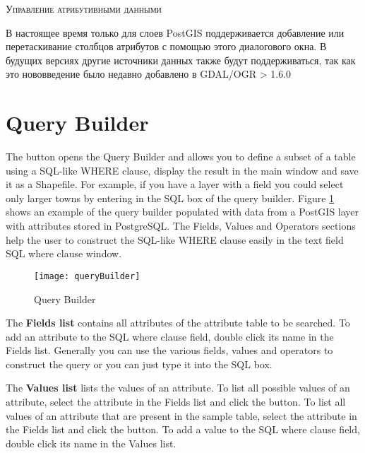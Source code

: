 \begin{Tip}\caption{\textsc{Управление атрибутивными данными}}
В настоящее время только для слоев PostGIS поддерживается добавление или
перетаскивание столбцов атрибутов с помощью этого диалогового окна. В
будущих версиях \qg другие источники данных также будут поддерживаться,
так как это нововведение было недавно добавлено в GDAL/OGR > 1.6.0
\end{Tip}

\section{Query Builder}\label{sec:query_builder}

The  button opens the Query Builder and allows you to
define a subset of a table using a SQL-like WHERE clause, display the result in the
main window and save it as a Shapefile. For example, if you have a
 layer
with a  field you could select only larger towns by entering
 in the SQL box of the query builder. Figure
\ref{fig:query_builder} shows an example of the query builder populated with
data from a PostGIS layer with attributes stored in PostgreSQL.
The Fields, Values and Operators sections help the user to construct the SQL-like
WHERE clause easily in the text field SQL where clause window.


\begin{figure}[ht]
  \centering
    \texttt{[image: queryBuilder]}
    \caption{Query Builder \nixcaption}\label{fig:query_builder}
\end{figure}

The \textbf{Fields list} contains all attributes of the attribute table to be
searched. To add an attribute to the SQL where clause field, double click its
name in the Fields list. Generally you can use the various fields, values and
operators to construct the query or you can just type it into the SQL box.

The \textbf{Values list} lists the values of an attribute. To list all possible
values of an attribute, select the attribute in the Fields list and click the
 button. To list all values
of an attribute that are present in the sample table, select the attribute in
the Fields list and click the 
button. To add a value to the SQL
where clause field, double click its name in the Values list.

